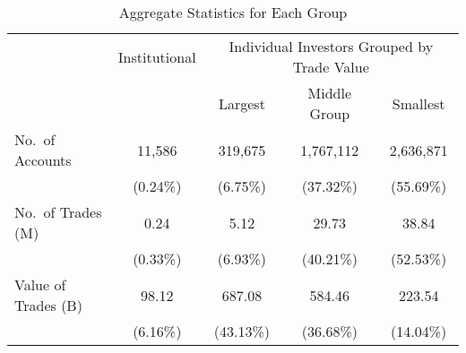 \documentclass{beamer}
\begin{document}
\begin{frame}
    \begin{table}
        \caption{Aggregate Statistics for Each Group}
        {\fontsize{9}{12} \selectfont
            \begin{tabular}{l*{4}{c}}
                \toprule
                                    & Institutional & \multicolumn{3}{c}{Individual Investors Grouped by Trade Value}                            \\
                \cmidrule(r){3-5}
                                    &               & Largest                                                         & Middle Group & Smallest  \\

                \midrule

                No.\ of Accounts    & 11,586        & 319,675                                                         & 1,767,112    & 2,636,871 \\
                                    & (0.24\%)      & (6.75\%)                                                        & (37.32\%)    & (55.69\%) \\
                \addlinespace

                No.\ of Trades (M)  & 0.24          & 5.12                                                            & 29.73        & 38.84     \\
                                    & (0.33\%)      & (6.93\%)                                                        & (40.21\%)    & (52.53\%) \\
                \addlinespace

                Value of Trades (B) & 98.12         & 687.08                                                          & 584.46       & 223.54    \\
                                    & (6.16\%)      & (43.13\%)                                                       & (36.68\%)    & (14.04\%) \\
                \bottomrule
            \end{tabular}
        }
    \end{table}
\end{frame}
\end{document}
